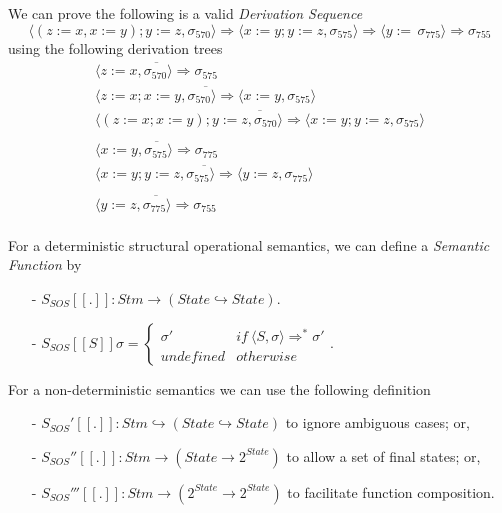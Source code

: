 \documentclass[11pt,a4paper]{article}
\begin{document}
We can prove the following is a valid \textit{Derivation Sequence}
$$\langle(z:=x,x:=y);y:=z,\sigma_{570}\rangle\Rightarrow\langle x:=y;y:=z,\sigma_{575}\rangle\Rightarrow\langle y:=\,\sigma_{775}\rangle\Rightarrow\sigma_{755}$$
using the following derivation trees
\[\begin{array}{l}
\overline{\langle z:=x,\sigma_{570}\rangle\Rightarrow\sigma_{575}}\\
\overline{\langle z:=x; x:=y,\sigma_{570}\rangle\Rightarrow\langle x:=y,\sigma_{575}\rangle}\\
\overline{\langle (z:=x; x:=y); y:=z,\sigma_{570}\rangle\Rightarrow\langle x:=y;y:=z,\sigma_{575}\rangle}\\
\\
\overline{\langle x:=y,\sigma_{575}\rangle\Rightarrow\sigma_{775}}\\
\overline{\langle x:=y; y:=z,\sigma_{575}\rangle\Rightarrow\langle y:=z,\sigma_{775}\rangle}\\
\\
\overline{\langle y:=z,\sigma_{775}\rangle\Rightarrow\sigma_{755}}\\
\end{array}\]

For a deterministic structural operational semantics, we can define a \textit{Semantic Function} by
\begin{itemize}
	\item[-] $S_{SOS}[[.]]:Stm\to(State\hookrightarrow State)$.
	\item[-] $S_{SOS}[[S]]\sigma=\begin{cases}\sigma'&if\ \langle S,\sigma\rangle\Rightarrow^*\sigma'\\undefined&otherwise\end{cases}$.
\end{itemize}

For a non-deterministic semantics we can use the following definition
\begin{itemize}
	\item[-] $S_{SOS}'[[.]]:Stm\hookrightarrow(State\hookrightarrow State)$ to ignore ambiguous cases; or,
	\item[-] $S_{SOS}''[[.]]:Stm\to(State\to 2^{State})$ to allow a set of final states; or,
	\item[-] $S_{SOS}'''[[.]]:Stm\to(2^{State}\to 2^{State})$ to facilitate function composition.
\end{itemize}
\end{document}
